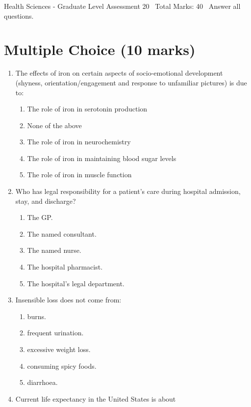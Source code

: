 \documentclass[12pt]{article}
\begin{document}
\begin{center}
Health Sciences - Graduate Level Assessment 20 \
Total Marks: 40 \
Answer all questions.
\end{center}

\section*{Multiple Choice (10 marks)}
\begin{enumerate}[label=\arabic*.]
\item The effects of iron on certain aspects of socio-emotional development (shyness, orientation/engagement and response to unfamiliar pictures) is due to:
\begin{enumerate}[label=(\alph*)]
    \item The role of iron in serotonin production
    \item None of the above
    \item The role of iron in neurochemistry
    \item The role of iron in maintaining blood sugar levels
    \item The role of iron in muscle function
\end{enumerate}
\item Who has legal responsibility for a patient's care during hospital admission, stay, and discharge?
\begin{enumerate}[label=(\alph*)]
    \item The GP.
    \item The named consultant.
    \item The named nurse.
    \item The hospital pharmacist.
    \item The hospital's legal department.
\end{enumerate}
\item Insensible loss does not come from:
\begin{enumerate}[label=(\alph*)]
    \item burns.
    \item frequent urination.
    \item excessive weight loss.
    \item consuming spicy foods.
    \item diarrhoea.
\end{enumerate}
\item Current life expectancy in the United States is about
\begin{enumerate}[label=(\alph*)]

\end{enumerate}
\end{enumerate}
\end{document}
